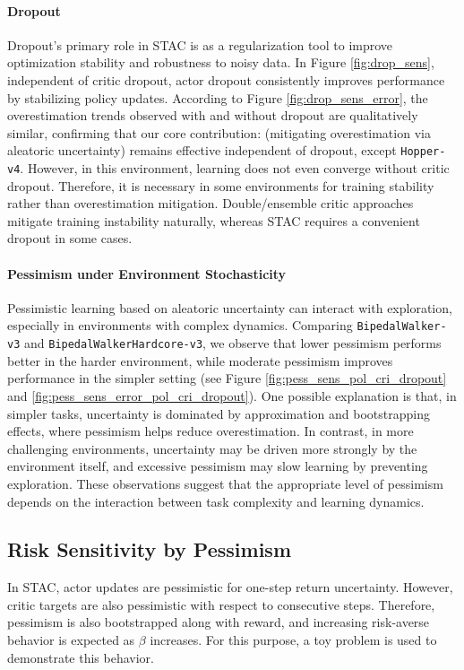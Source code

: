 \documentclass[10pt]{article} %
\begin{document}
\paragraph{Dropout}
Dropout's primary role in STAC is as a regularization tool to improve optimization stability and robustness to noisy data. In Figure \ref{fig:drop_sens}, independent of critic dropout, actor dropout consistently improves performance by stabilizing policy updates. According to Figure \ref{fig:drop_sens_error}, the overestimation trends observed with and without dropout are qualitatively similar, confirming that our core contribution: (mitigating overestimation via aleatoric uncertainty) remains effective independent of dropout, except \verb|Hopper-v4|. However, in this environment, learning does not even converge without critic dropout. Therefore, it is necessary in some environments for training stability rather than overestimation mitigation. Double/ensemble critic approaches mitigate training instability naturally, whereas STAC requires a convenient dropout in some cases. 

\paragraph{Pessimism under Environment Stochasticity}

Pessimistic learning based on aleatoric uncertainty can interact with exploration, especially in environments with complex dynamics. Comparing \verb|BipedalWalker-v3| and \verb|BipedalWalkerHardcore-v3|, we observe that lower pessimism performs better in the harder environment, while moderate pessimism improves performance in the simpler setting (see Figure \ref{fig:pess_sens_pol_cri_dropout} and \ref{fig:pess_sens_error_pol_cri_dropout}). One possible explanation is that, in simpler tasks, uncertainty is dominated by approximation and bootstrapping effects, where pessimism helps reduce overestimation. In contrast, in more challenging environments, uncertainty may be driven more strongly by the environment itself, and excessive pessimism may slow learning by preventing exploration. These observations suggest that the appropriate level of pessimism depends on the interaction between task complexity and learning dynamics.


\subsection{Risk Sensitivity by Pessimism}

In STAC, actor updates are pessimistic for one-step return uncertainty. However, critic targets are also pessimistic with respect to consecutive steps. Therefore, pessimism is also bootstrapped along with reward, and increasing risk-averse behavior is expected as $\beta$ increases. For this purpose, a toy problem is used to demonstrate this behavior. 
\end{document}
